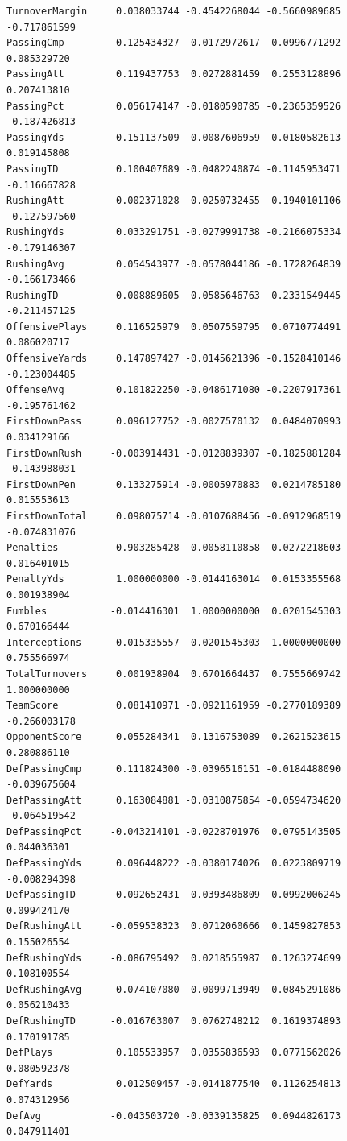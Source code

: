 \documentclass[
  letterpaper,
  DIV=11,
  numbers=noendperiod]{scrreprt}
\begin{document}
\begin{verbatim}
TurnoverMargin     0.038033744 -0.4542268044 -0.5660989685   -0.717861599
PassingCmp         0.125434327  0.0172972617  0.0996771292    0.085329720
PassingAtt         0.119437753  0.0272881459  0.2553128896    0.207413810
PassingPct         0.056174147 -0.0180590785 -0.2365359526   -0.187426813
PassingYds         0.151137509  0.0087606959  0.0180582613    0.019145808
PassingTD          0.100407689 -0.0482240874 -0.1145953471   -0.116667828
RushingAtt        -0.002371028  0.0250732455 -0.1940101106   -0.127597560
RushingYds         0.033291751 -0.0279991738 -0.2166075334   -0.179146307
RushingAvg         0.054543977 -0.0578044186 -0.1728264839   -0.166173466
RushingTD          0.008889605 -0.0585646763 -0.2331549445   -0.211457125
OffensivePlays     0.116525979  0.0507559795  0.0710774491    0.086020717
OffensiveYards     0.147897427 -0.0145621396 -0.1528410146   -0.123004485
OffenseAvg         0.101822250 -0.0486171080 -0.2207917361   -0.195761462
FirstDownPass      0.096127752 -0.0027570132  0.0484070993    0.034129166
FirstDownRush     -0.003914431 -0.0128839307 -0.1825881284   -0.143988031
FirstDownPen       0.133275914 -0.0005970883  0.0214785180    0.015553613
FirstDownTotal     0.098075714 -0.0107688456 -0.0912968519   -0.074831076
Penalties          0.903285428 -0.0058110858  0.0272218603    0.016401015
PenaltyYds         1.000000000 -0.0144163014  0.0153355568    0.001938904
Fumbles           -0.014416301  1.0000000000  0.0201545303    0.670166444
Interceptions      0.015335557  0.0201545303  1.0000000000    0.755566974
TotalTurnovers     0.001938904  0.6701664437  0.7555669742    1.000000000
TeamScore          0.081410971 -0.0921161959 -0.2770189389   -0.266003178
OpponentScore      0.055284341  0.1316753089  0.2621523615    0.280886110
DefPassingCmp      0.111824300 -0.0396516151 -0.0184488090   -0.039675604
DefPassingAtt      0.163084881 -0.0310875854 -0.0594734620   -0.064519542
DefPassingPct     -0.043214101 -0.0228701976  0.0795143505    0.044036301
DefPassingYds      0.096448222 -0.0380174026  0.0223809719   -0.008294398
DefPassingTD       0.092652431  0.0393486809  0.0992006245    0.099424170
DefRushingAtt     -0.059538323  0.0712060666  0.1459827853    0.155026554
DefRushingYds     -0.086795492  0.0218555987  0.1263274699    0.108100554
DefRushingAvg     -0.074107080 -0.0099713949  0.0845291086    0.056210433
DefRushingTD      -0.016763007  0.0762748212  0.1619374893    0.170191785
DefPlays           0.105533957  0.0355836593  0.0771562026    0.080592378
DefYards           0.012509457 -0.0141877540  0.1126254813    0.074312956
DefAvg            -0.043503720 -0.0339135825  0.0944826173    0.047911401

\end{verbatim}
\end{document}
